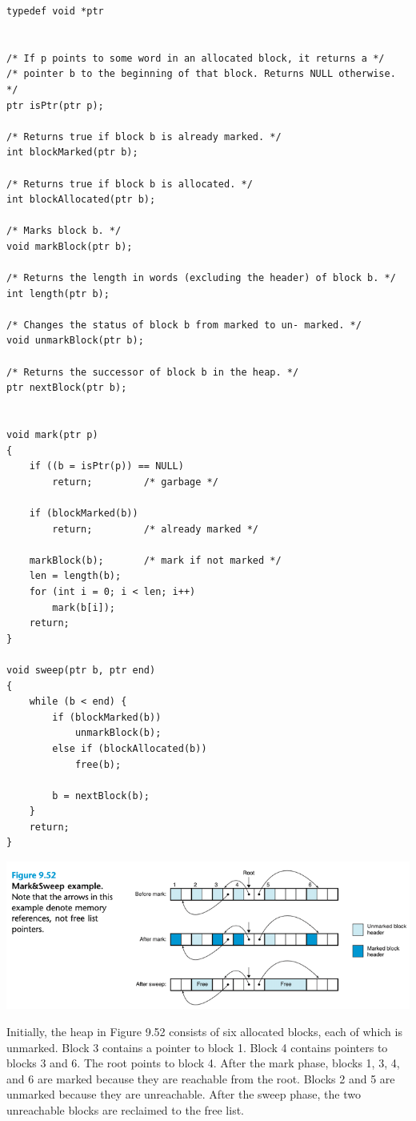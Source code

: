 \documentclass[11pt]{article}
\begin{document}
\begin{verbatim}
typedef void *ptr


/* If p points to some word in an allocated block, it returns a */
/* pointer b to the beginning of that block. Returns NULL otherwise. */
ptr isPtr(ptr p);

/* Returns true if block b is already marked. */
int blockMarked(ptr b);

/* Returns true if block b is allocated. */
int blockAllocated(ptr b);

/* Marks block b. */
void markBlock(ptr b);

/* Returns the length in words (excluding the header) of block b. */
int length(ptr b);

/* Changes the status of block b from marked to un- marked. */
void unmarkBlock(ptr b);

/* Returns the successor of block b in the heap. */
ptr nextBlock(ptr b);


void mark(ptr p)
{
    if ((b = isPtr(p)) == NULL)
        return;			/* garbage */

    if (blockMarked(b))
        return;			/* already marked */

    markBlock(b);		/* mark if not marked */
    len = length(b);
    for (int i = 0; i < len; i++)
        mark(b[i]);
    return;
}

void sweep(ptr b, ptr end)
{
    while (b < end) {
        if (blockMarked(b))
            unmarkBlock(b);
        else if (blockAllocated(b))
            free(b);

        b = nextBlock(b);
    }
    return;
}

\end{verbatim}

\begin{center}
\includegraphics[width=.9\linewidth]{pics/figure9.52-mark-and-sweep.png}
\end{center}

Initially, the heap in Figure 9.52 consists of six allocated blocks, each of which is unmarked. Block 3 contains a pointer to block 1. Block 4 contains pointers to blocks 3 and 6. The root points to block 4. After the mark phase, blocks 1, 3, 4, and 6 are marked because they are reachable from the root. Blocks 2 and 5 are unmarked because they are unreachable. After the sweep phase, the two unreachable blocks are reclaimed to the free list.\\
\end{document}
